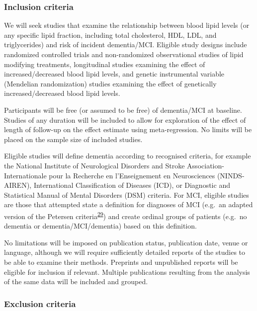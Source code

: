 \documentclass[a4paper, twoside]{templates/ociamthesis}
\begin{document}
\hypertarget{inclusion-criteria}{%
\subsubsection{Inclusion criteria}\label{inclusion-criteria}}

We will seek studies that examine the relationship between blood lipid levels (or any specific lipid fraction, including total cholesterol, HDL, LDL, and triglycerides) and risk of incident dementia/MCI. Eligible study designs include randomized controlled trials and non-randomized observational studies of lipid modifying treatments, longitudinal studies examining the effect of increased/decreased blood lipid levels, and genetic instrumental variable (Mendelian randomization) studies examining the effect of genetically increased/decreased blood lipid levels.

Participants will be free (or assumed to be free) of dementia/MCI at baseline. Studies of any duration will be included to allow for exploration of the effect of length of follow-up on the effect estimate using meta-regression. No limits will be placed on the sample size of included studies.

Eligible studies will define dementia according to recognised criteria, for example the National Institute of Neurological Disorders and Stroke Association-Internationale pour la Recherche en l'Enseignement en Neurosciences (NINDS-AIREN), International Classification of Diseases (ICD), or Diagnostic and Statistical Manual of Mental Disorders (DSM) criteria. For MCI, eligible studies are those that attempted state a definition for diagnoses of MCI (e.g.~an adapted version of the Petersen criteria\textsuperscript{\protect\hyperlink{ref-petersen1999}{29}}) and create ordinal groups of patients (e.g.~no dementia or dementia/MCI/dementia) based on this definition.

No limitations will be imposed on publication status, publication date, venue or language, although we will require sufficiently detailed reports of the studies to be able to examine their methods. Preprints and unpublished reports will be eligible for inclusion if relevant. Multiple publications resulting from the analysis of the same data will be included and grouped.

\hypertarget{exclusion-criteria}{%
\subsubsection{Exclusion criteria}\label{exclusion-criteria}}
\end{document}

